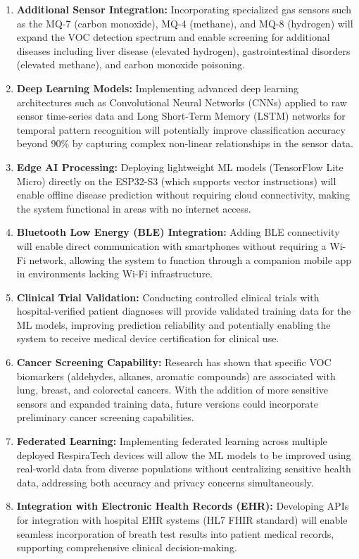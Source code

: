 \begin{enumerate}[leftmargin=1.5cm]
\item \textbf{Additional Sensor Integration:} Incorporating specialized gas sensors such as the MQ-7 (carbon monoxide), MQ-4 (methane), and MQ-8 (hydrogen) will expand the VOC detection spectrum and enable screening for additional diseases including liver disease (elevated hydrogen), gastrointestinal disorders (elevated methane), and carbon monoxide poisoning.

\item \textbf{Deep Learning Models:} Implementing advanced deep learning architectures such as Convolutional Neural Networks (CNNs) applied to raw sensor time-series data and Long Short-Term Memory (LSTM) networks for temporal pattern recognition will potentially improve classification accuracy beyond 90\% by capturing complex non-linear relationships in the sensor data.

\item \textbf{Edge AI Processing:} Deploying lightweight ML models (TensorFlow Lite Micro) directly on the ESP32-S3 (which supports vector instructions) will enable offline disease prediction without requiring cloud connectivity, making the system functional in areas with no internet access.

\item \textbf{Bluetooth Low Energy (BLE) Integration:} Adding BLE connectivity will enable direct communication with smartphones without requiring a Wi-Fi network, allowing the system to function through a companion mobile app in environments lacking Wi-Fi infrastructure.

\item \textbf{Clinical Trial Validation:} Conducting controlled clinical trials with hospital-verified patient diagnoses will provide validated training data for the ML models, improving prediction reliability and potentially enabling the system to receive medical device certification for clinical use.

\item \textbf{Cancer Screening Capability:} Research has shown that specific VOC biomarkers (aldehydes, alkanes, aromatic compounds) are associated with lung, breast, and colorectal cancers. With the addition of more sensitive sensors and expanded training data, future versions could incorporate preliminary cancer screening capabilities.

\item \textbf{Federated Learning:} Implementing federated learning across multiple deployed RespiraTech devices will allow the ML models to be improved using real-world data from diverse populations without centralizing sensitive health data, addressing both accuracy and privacy concerns simultaneously.

\item \textbf{Integration with Electronic Health Records (EHR):} Developing APIs for integration with hospital EHR systems (HL7 FHIR standard) will enable seamless incorporation of breath test results into patient medical records, supporting comprehensive clinical decision-making.
\end{enumerate}
